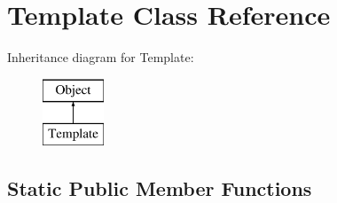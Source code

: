 \hypertarget{class_template}{
\section{Template Class Reference}
\label{class_template}
}
Inheritance diagram for Template:\begin{figure}[H]
\begin{center}
\leavevmode
\includegraphics[height=2.000000cm]{class_template}
\end{center}
\end{figure}
\subsection*{Static Public Member Functions}
